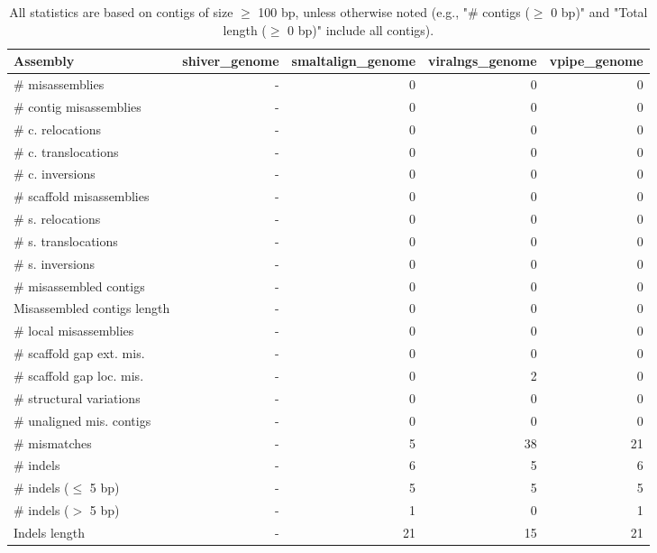 \documentclass[12pt,a4paper]{article}
\begin{document}
\begin{table}[ht]
\begin{center}
\caption{All statistics are based on contigs of size $\geq$ 100 bp, unless otherwise noted (e.g., "\# contigs ($\geq$ 0 bp)" and "Total length ($\geq$ 0 bp)" include all contigs).}
\begin{tabular}{|l*{4}{|r}|}
\hline
Assembly & shiver\_genome & smaltalign\_genome & viralngs\_genome & vpipe\_genome \\ \hline
\# misassemblies & - & 0 & 0 & 0 \\ \hline
\hspace{2mm}\# contig misassemblies & - & 0 & 0 & 0 \\ \hline
\hspace{5mm}\# c. relocations & - & 0 & 0 & 0 \\ \hline
\hspace{5mm}\# c. translocations & - & 0 & 0 & 0 \\ \hline
\hspace{5mm}\# c. inversions & - & 0 & 0 & 0 \\ \hline
\hspace{2mm}\# scaffold misassemblies & - & 0 & 0 & 0 \\ \hline
\hspace{5mm}\# s. relocations & - & 0 & 0 & 0 \\ \hline
\hspace{5mm}\# s. translocations & - & 0 & 0 & 0 \\ \hline
\hspace{5mm}\# s. inversions & - & 0 & 0 & 0 \\ \hline
\# misassembled contigs & - & 0 & 0 & 0 \\ \hline
Misassembled contigs length & - & 0 & 0 & 0 \\ \hline
\# local misassemblies & - & 0 & 0 & 0 \\ \hline
\# scaffold gap ext. mis. & - & 0 & 0 & 0 \\ \hline
\# scaffold gap loc. mis. & - & 0 & 2 & 0 \\ \hline
\# structural variations & - & 0 & 0 & 0 \\ \hline
\# unaligned mis. contigs & - & 0 & 0 & 0 \\ \hline
\# mismatches & - & 5 & 38 & 21 \\ \hline
\# indels & - & 6 & 5 & 6 \\ \hline
\hspace{5mm}\# indels ($\leq$ 5 bp) & - & 5 & 5 & 5 \\ \hline
\hspace{5mm}\# indels ($>$ 5 bp) & - & 1 & 0 & 1 \\ \hline
Indels length & - & 21 & 15 & 21 \\ \hline
\end{tabular}
\end{center}
\end{table}
\end{document}
